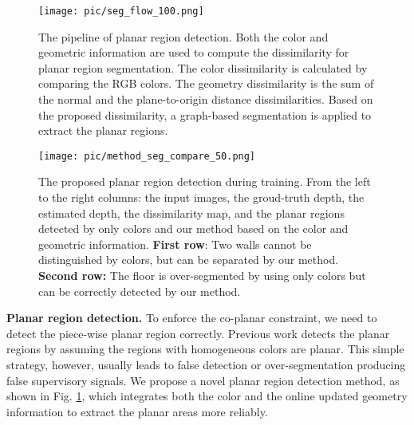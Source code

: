 \documentclass[10pt,twocolumn,letterpaper]{article}
\newcommand{\Fig}[1]{Fig. \ref{#1}}
\begin{document}
\begin{figure}
	\texttt{[image: pic/seg\_flow\_100.png]}	\caption{The pipeline of planar region detection.
		Both the color and geometric information are used to compute the dissimilarity for planar region segmentation.
		The color dissimilarity is calculated by comparing the RGB colors.
		The geometry dissimilarity is the sum of the normal and the plane-to-origin distance dissimilarities.
		Based on the proposed dissimilarity,  a graph-based segmentation \cite{felzenszwalb2004efficient} is applied to extract the planar regions.
	}
	\label{fig:seg_flowchart}
\end{figure}

\begin{figure*}[ht]
	\centering
	\texttt{[image: pic/method\_seg\_compare\_50.png]} \caption{The proposed planar region detection during training.
		From the left to the right columns: the input images, the groud-truth depth, the estimated depth, the dissimilarity map, and the planar regions detected by only colors \cite{yu2020p} and our method based on the color and geometric information.
		\textbf{First row}: Two walls cannot be distinguished by colors, but can be separated by our method.
		\textbf{Second row:} The floor is over-segmented by using only colors but can be correctly detected by our method.
	}
	\label{fig:method_seg_compare}
\end{figure*}

\textbf{Planar region detection.}
To enforce the co-planar constraint, we need to detect the piece-wise planar region correctly. Previous work \cite{yu2020p} detects the planar regions by assuming the regions with homogeneous colors are planar. This simple strategy, however, usually leads to false detection or over-segmentation producing false supervisory signals. We propose a novel planar region detection method, as shown in \Fig{fig:seg_flowchart}, which integrates both the color and the online updated geometry information to extract the planar areas more reliably. 
\end{document}

